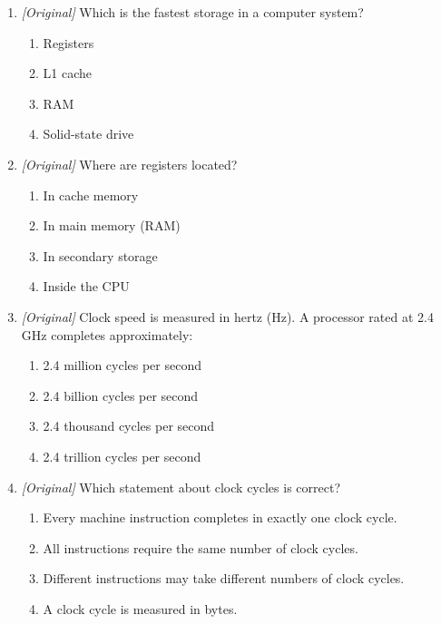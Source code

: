 \documentclass[11pt]{article}
\begin{document}
\begin{enumerate}[label=\textbf{Q\arabic*.}, leftmargin=*]
\begin{enumerate}[label=\Alph*.]
    \item intermediate arithmetic and logic results
    \item the last instruction fetched from memory
    \item a permanent copy of the operating system
  \end{enumerate}
\item \textit{[Original]} Which is the fastest storage in a computer system?
  \begin{enumerate}[label=\Alph*.]
    \item Registers
    \item L1 cache
    \item RAM
    \item Solid-state drive
  \end{enumerate}
\item \textit{[Original]} Where are registers located?
  \begin{enumerate}[label=\Alph*.]
    \item In cache memory
    \item In main memory (RAM)
    \item In secondary storage
    \item Inside the CPU
  \end{enumerate}
\item \textit{[Original]} Clock speed is measured in hertz (Hz). A processor
  rated at 2.4 GHz completes approximately:
  \begin{enumerate}[label=\Alph*.]
    \item 2.4 million cycles per second
    \item 2.4 billion cycles per second
    \item 2.4 thousand cycles per second
    \item 2.4 trillion cycles per second
  \end{enumerate}
\item \textit{[Original]} Which statement about clock cycles is correct?
  \begin{enumerate}[label=\Alph*.]
    \item Every machine instruction completes in exactly one clock cycle.
    \item All instructions require the same number of clock cycles.
    \item Different instructions may take different numbers of clock cycles.
    \item A clock cycle is measured in bytes.
  \end{enumerate}

\end{enumerate}
\end{document}
